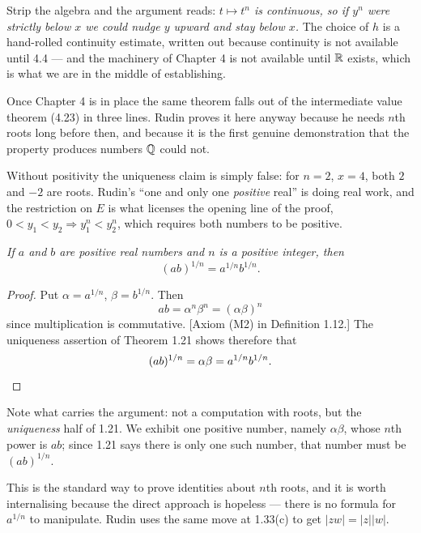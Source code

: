 \begin{deeper}
Strip the algebra and the argument reads: \emph{$t \mapsto t^n$ is continuous,
so if $y^n$ were strictly below $x$ we could nudge $y$ upward and stay below
$x$.} The choice of $h$ is a hand-rolled continuity estimate, written out
because continuity is not available until 4.4 --- and the machinery of Chapter 4
is not available until $\mathbb{R}$ exists, which is what we are in the middle of
establishing.

Once Chapter 4 is in place the same theorem falls out of the intermediate value
theorem (4.23) in three lines. Rudin proves it here anyway because he needs
$n$th roots long before then, and because it is the first genuine demonstration
that the \lub{} property produces numbers $\mathbb{Q}$ could not.
\end{deeper}

\begin{pitfall}
Without positivity the uniqueness claim is simply false: for $n = 2$, $x = 4$,
both $2$ and $-2$ are roots. Rudin's ``one and only one \emph{positive} real''
is doing real work, and the restriction on $E$ is what licenses the opening line
of the proof, $0 < y_1 < y_2 \Rightarrow y_1^n < y_2^n$, which requires both
numbers to be positive.
\end{pitfall}

\emph{If $a$ and $b$ are positive real numbers and $n$ is a positive integer,
then}
\[ (ab)^{1/n} = a^{1/n}b^{1/n}. \]

\begin{proof}
Put $\alpha = a^{1/n}$, $\beta = b^{1/n}$. Then
\[ ab = \alpha^n\beta^n = (\alpha\beta)^n \]
since multiplication is commutative. [Axiom (M2) in Definition 1.12.] The
uniqueness assertion of Theorem 1.21 shows therefore that
\[ (ab)^{1/n} = \alpha\beta = a^{1/n}b^{1/n}. \qedhere \]
\end{proof}

\begin{unpack}
Note what carries the argument: not a computation with roots, but the
\emph{uniqueness} half of 1.21. We exhibit one positive number, namely
$\alpha\beta$, whose $n$th power is $ab$; since 1.21 says there is only one such
number, that number must be $(ab)^{1/n}$.

This is the standard way to prove identities about $n$th roots, and it is worth
internalising because the direct approach is hopeless --- there is no formula
for $a^{1/n}$ to manipulate. Rudin uses the same move at 1.33(c) to get
$|zw| = |z||w|$.
\end{unpack}

